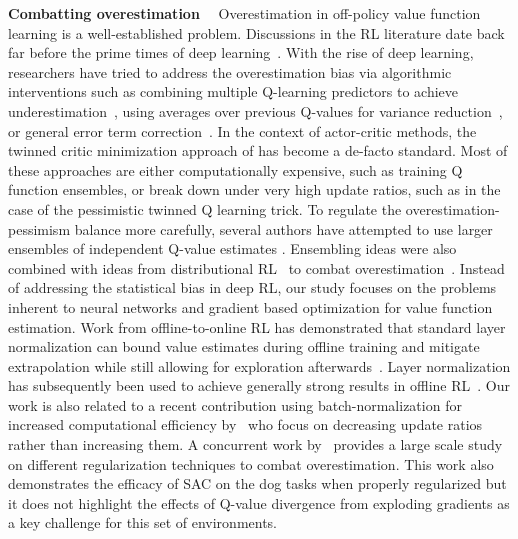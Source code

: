 {\bf Combatting overestimation}~~
Overestimation in off-policy value function learning is a well-established problem.
Discussions in the RL literature date back far before the prime times of deep learning~\parencite{thrun1993issues, precup2001off}. 
With the rise of deep learning, researchers have tried to address the overestimation bias via algorithmic interventions such as combining multiple Q-learning predictors to achieve underestimation~\parencite{hasselt2010double, hasselt2016deep, zongzhang2017weighted, lan2020maxmin}, using averages over previous Q-values for variance reduction~\parencite{anschel2017averaged}, or general error term correction~\parencite{donghun2013bias, fox2016taming}. In the context of actor-critic methods, the twinned critic minimization approach of \textcite{fujimoto2018addressing} has become a de-facto standard. 
Most of these approaches are either computationally expensive, such as training Q function ensembles, or break down under very high update ratios, such as in the case of the pessimistic twinned Q learning trick.
To regulate the overestimation-pessimism balance more carefully, several authors have attempted to use larger ensembles of independent Q-value estimates \parencite{lee2021sunrise,peer2021ensemble,chen2021randomized,hiraoka2022dropout}. Ensembling ideas were also combined with ideas from distributional RL~\parencite{bellemare2017distributional} to combat overestimation~\parencite{kuznetsov2020controlling}.  Instead of addressing the statistical bias in deep RL, our study focuses on the problems inherent to neural networks and gradient based optimization for value function estimation. Work from offline-to-online RL has demonstrated that standard layer normalization can bound value estimates during offline training and mitigate extrapolation while still allowing for exploration afterwards~\parencite{ball2023efficient}. Layer normalization has subsequently been used to achieve generally strong results in offline RL~\parencite{tarasov2023rebrac}. Our work is also related to a recent contribution using batch-normalization for increased computational efficiency by~\textcite{bhatt2024crossq} who focus on decreasing update ratios rather than increasing them. A concurrent work by~\textcite{nauman2024overestimation} provides a large scale study on different regularization techniques to combat overestimation. This work also demonstrates the efficacy of SAC on the dog tasks when properly regularized but it does not highlight the effects of Q-value divergence from exploding gradients as a key challenge for this set of environments.

